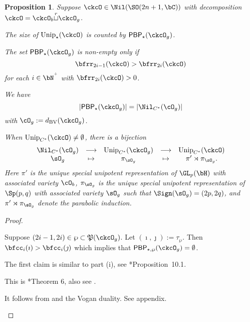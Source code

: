 \documentclass[12pt,a4paper]{amsart}
\def\abs#1{\left|{#1}\right|}
\numberwithin{equation}{section}
\newtheorem{prop}[thm]{Proposition}
\theoremstyle{remark}
\def\Unip{\mathrm{Unip}}
\def\dBV{d_{\mathrm{BV}}}
\def\cuprow{{\stackrel{r}{\sqcup}}}
\def\CPP{\mathfrak{P}}
\def\PBP{\mathsf{PBP}}
\begin{document}
\begin{prop}
  Suppose $\ckcO\in \Nil(\SO(2n+1,\bC))$ with decomposition
  $\ckcO = \ckcO_{b}\cuprow \ckcO_{g}$.
  \begin{enumT}
    \item The size of $\Unip_{\star}(\ckcO)$ is counted by
    $\PBP_{\star}(\ckcO_{g})$.
    \item The set $\PBP_{\star}(\ckcO_{g})$ is non-empty only if
    \[
      \bfrr_{2i-1}(\ckcO)> \bfrr_{2i}(\ckcO)
    \]
    for each $i\in \bN^{^{+}}$ with $\bfrr_{2i}(\ckcO)>0$.
    \item We have
    \[
      \abs{\PBP_{\star}(\ckcO_{g})} = \abs{\Nil_{C^{*}}(\cO_{g})}
    \]
    with $\cO_{g} := \dBV(\ckcO_{g})$.
    \item When $\Unip_{C^{*}}(\ckcO)\neq \emptyset$, there is a bijection
    \[
      \begin{array}{ccccc}
        \Nil_{C^{*}}(\cO_{g})& \longrightarrow & \Unip_{C^{*}}(\ckcO_{g})
        &\longrightarrow &\Unip_{C^{*}}(\ckcO) \\
        \sO_{g} & \mapsto & \pi_{\sO_{g}} & \mapsto
                         & \pi'\rtimes \pi_{\sO_{g}}.
      \end{array}
    \]
    Here $\pi'$ is the unique special unipotent representation of $\GL_p(\bH)$
    with associated variety $\cO_{b}$, $\pi_{\sO_{g}}$ is the unique special
    unipotent representation of $\Sp(p,q)$ with associated variety $\sO_{g}$
    such that $\Sign(\sO_{g}) = (2p,2q)$, and $\pi'\rtimes \pi_{\sO_{g}}$ denote
    the parabolic induction.
  \end{enumT}
\end{prop}
\begin{proof}
  \begin{enumPF}
    \item
    Suppose $(2i-1,2i)\in \wp\subset \CPP(\ckcO_{g})$.
    Let $(\imath,\jmath) :=\tau_{\wp}$. Then
    $\bfcc_{i}(\imath)>\bfcc_{i}(\jmath)$ which implies that
    $\PBP_{\star,\wp}(\ckcO_{g}) = \emptyset$.
    \item
    The first claim is similar to part (i), see \cite{BMSZ2}*{Proposition~10.1}.
    \item This is \cite{Mc}*{Theorem 6}, also see \cite{BMSZ2}.
    \item
    It follows from  and the Vogan duality.
    See appendix.
  \end{enumPF}
\end{proof}
\end{document}
